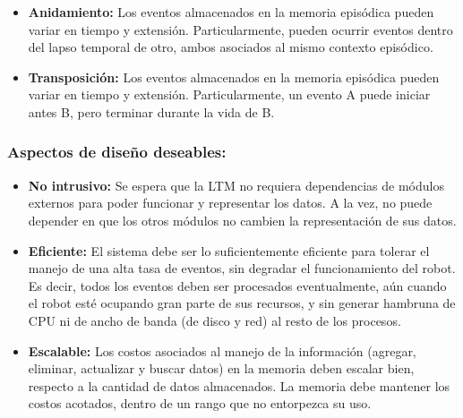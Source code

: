 \begin{itemize}[topsep=0pt]
	\item {} {\bfseries Anidamiento:}
	Los eventos almacenados en la memoria episódica pueden variar en tiempo y extensión. Particularmente, pueden ocurrir eventos dentro del lapso temporal de otro, ambos asociados al mismo contexto episódico.
	
	\item {} {\bfseries Transposición:}
	Los eventos almacenados en la memoria episódica pueden variar en tiempo y extensión. Particularmente, un evento A puede iniciar antes B, pero terminar durante la vida de B.
	
\end{itemize}

\subsubsection{Aspectos de diseño deseables:}

\begin{itemize}[topsep=0pt]
	\setlength\itemsep{0.2em}
	\item {} {\bfseries No intrusivo:}
	Se espera que la LTM no requiera dependencias de módulos externos para poder funcionar y representar los datos. A la vez, no puede depender en que los otros módulos no cambien la representación de sus datos.
	
	\item {} {\bfseries Eficiente:}
	El sistema debe ser lo suficientemente eficiente para tolerar el manejo de una alta tasa de eventos, sin degradar el funcionamiento del robot. Es decir, todos los eventos deben ser procesados eventualmente, aún cuando el robot esté ocupando gran parte de sus recursos, y sin generar hambruna de CPU ni de ancho de banda (de disco y red) al resto de los procesos.
	
	\item {} {\bfseries Escalable:}
	Los costos asociados al manejo de la información (agregar, eliminar, actualizar y buscar datos) en la memoria deben escalar bien, respecto a la cantidad de datos almacenados. La memoria debe mantener los costos acotados, dentro de un rango que no entorpezca su uso.
	
\end{itemize}


